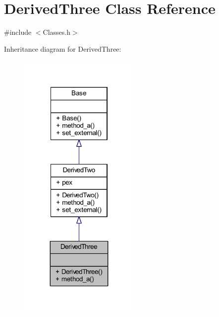 \hypertarget{class_derived_three}{}\section{Derived\+Three Class Reference}
\label{class_derived_three}


{\ttfamily \#include $<$Classes.\+h$>$}



Inheritance diagram for Derived\+Three\+:
\nopagebreak
\begin{figure}[H]
\begin{center}
\leavevmode
\includegraphics[width=167pt]{class_derived_three__inherit__graph}
\end{center}
\end{figure}


